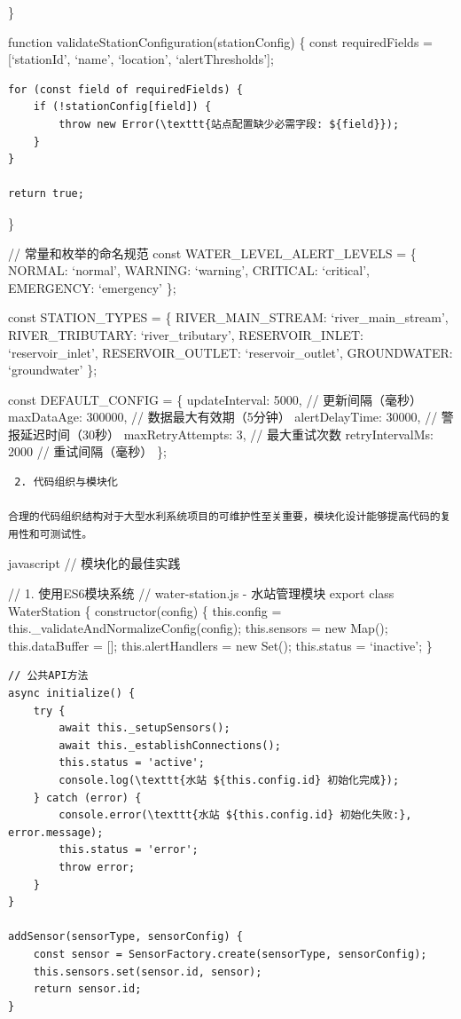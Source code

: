 {{\}

function validateStationConfiguration(stationConfig) \{ const requiredFields = {[}`stationId', `name', `location', `alertThresholds'{]};

\begin{verbatim}
for (const field of requiredFields) {
    if (!stationConfig[field]) {
        throw new Error(\texttt{站点配置缺少必需字段: ${field}});
    }
}

return true;
\end{verbatim}

\}

// 常量和枚举的命名规范 const WATER\_LEVEL\_ALERT\_LEVELS = \{ NORMAL: `normal', WARNING: `warning', CRITICAL: `critical', EMERGENCY: `emergency' \};

const STATION\_TYPES = \{ RIVER\_MAIN\_STREAM: `river\_main\_stream', RIVER\_TRIBUTARY: `river\_tributary', RESERVOIR\_INLET: `reservoir\_inlet', RESERVOIR\_OUTLET: `reservoir\_outlet', GROUNDWATER: `groundwater' \};

const DEFAULT\_CONFIG = \{ updateInterval: 5000, // 更新间隔（毫秒） maxDataAge: 300000, // 数据最大有效期（5分钟） alertDelayTime: 30000, // 警报延迟时间（30秒） maxRetryAttempts: 3, // 最大重试次数 retryIntervalMs: 2000 // 重试间隔（毫秒） \};

\begin{lstlisting}
 2. 代码组织与模块化

合理的代码组织结构对于大型水利系统项目的可维护性至关重要，模块化设计能够提高代码的复用性和可测试性。
\end{lstlisting}

javascript // 模块化的最佳实践

// 1. 使用ES6模块系统 // water-station.js - 水站管理模块 export class WaterStation \{ constructor(config) \{ this.config = this.\_validateAndNormalizeConfig(config); this.sensors = new Map(); this.dataBuffer = {[}{]}; this.alertHandlers = new Set(); this.status = `inactive'; \}

\begin{verbatim}
// 公共API方法
async initialize() {
    try {
        await this._setupSensors();
        await this._establishConnections();
        this.status = 'active';
        console.log(\texttt{水站 ${this.config.id} 初始化完成});
    } catch (error) {
        console.error(\texttt{水站 ${this.config.id} 初始化失败:}, error.message);
        this.status = 'error';
        throw error;
    }
}

addSensor(sensorType, sensorConfig) {
    const sensor = SensorFactory.create(sensorType, sensorConfig);
    this.sensors.set(sensor.id, sensor);
    return sensor.id;
}


\end{verbatim}}}
